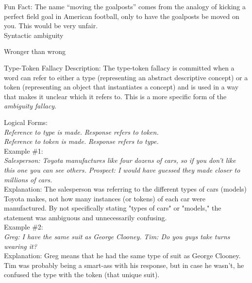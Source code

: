 \documentclass[a4paper,12pt,single,pdftex]{scrartcl}
\begin{document}
    
      Fun Fact: The name “moving the goalposts” comes from the analogy of kicking a perfect field goal in American football, only to have the goalposts be moved on you. This would be very unfair.
    \\

  

Syntactic ambiguity

Wronger than wrong

Type-Token Fallacy
    Description: The type-token fallacy is committed when a word can refer to either a type (representing an abstract descriptive concept) or a token (representing an object that instantiates a concept) and is used in a way that makes it unclear which it refers to. This is a more specific form of the {\it ambiguity fallacy}.

    
      Logical Forms:
    \\

    
      {\em Reference to type is made.} \newline
{\em Response refers to token.}
    \\

    
      {\em Reference to token is made.} \newline
{\em Response refers to type.}
    \\

    
      Example \#1:
    \\

    
      {\em Salesperson: Toyota manufactures like four dozens of cars, so if you don't like this one you can see others. \newline
Prospect: I would have guessed they made closer to millions of cars.}
    \\

    
      Explanation: The salesperson was referring to the different types of cars (models) Toyota makes, not how many instances (or tokens) of each car were manufactured. By not specifically stating "types of cars" or "models," the statement was ambiguous and unnecessarily confusing.
    \\

    
      Example \#2:
    \\

    
      {\em Greg: I have the same suit as George Clooney.} \newline
{\em Tim: Do you guys take turns wearing it?}
    \\

    
      Explanation: Greg means that he had the same type of suit as George Clooney. Tim was probably being a smart-ass with his response, but in case he wasn’t, he confused the type with the token (that unique suit).
    \\
\end{document}
